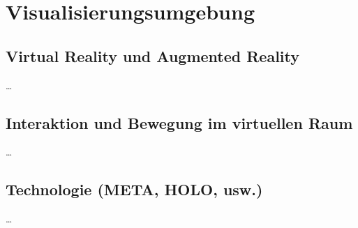 \section{Visualisierungsumgebung}
\subsection{Virtual Reality und Augmented Reality}
\ldots
\subsection{Interaktion und Bewegung im virtuellen Raum}
\ldots
\subsection{Technologie (META, HOLO, usw.)}
\ldots
